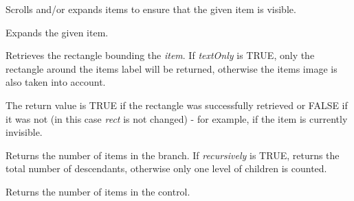 

\label{wxtreectrlensurevisible}


Scrolls and/or expands items to ensure that the given item is visible.

\label{wxtreectrlexpand}


Expands the given item.

\label{wxtreectrlgetitemrect}


Retrieves the rectangle bounding the {\it item}. If {\it textOnly} is TRUE,
only the rectangle around the items label will be returned, otherwise the
items image is also taken into account.

The return value is TRUE if the rectangle was successfully retrieved or FALSE
if it was not (in this case {\it rect} is not changed) - for example, if the
item is currently invisible.


\label{wxtreectrlgetchildrencount}


Returns the number of items in the branch. If {\it recursively} is TRUE, returns the total number
of descendants, otherwise only one level of children is counted.

\label{wxtreectrlgetcount}


Returns the number of items in the control.

\label{wxtreectrlgeteditcontrol}



